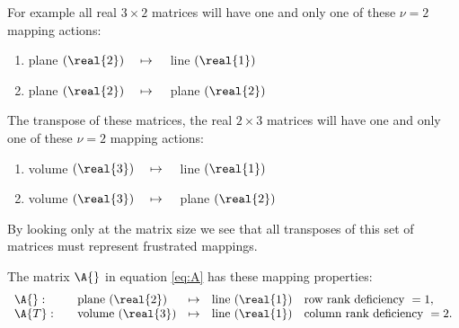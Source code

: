 For example all real $3\times2$ matrices will have one and only one of these $\nu=2$ mapping actions:
\begin{enumerate}
\item plane $(\real{2}) \quad \mapsto \quad$ line   $(\real{1})$
\item plane $(\real{2}) \quad \mapsto \quad$ plane  $(\real{2})$
\end{enumerate}

The transpose of these matrices, the real $2\times3$ matrices will have one and only one of these $\nu=2$ mapping actions:
\begin{enumerate}
\item volume $(\real{3}) \quad \mapsto \quad$ line   $(\real{1})$
\item volume $(\real{3}) \quad \mapsto \quad$ plane  $(\real{2})$
\end{enumerate}
By looking only at the matrix size we see that all transposes of this set of matrices must represent frustrated mappings.

The matrix $\A{}$ in equation \eqref{eq:A} has these mapping properties:
\begin{equation}
  \begin{array}{llcll}
    \A{}:\quad & \text{plane }(\real{2}) &\mapsto & \text{line }(\real{1}) & \text{row rank deficiency }=1,\\
    \A{T}:\quad & \text{volume }(\real{3}) &\mapsto & \text{line }(\real{1}) & \text{column rank deficiency }=2.\\
  \end{array}
\end{equation}


